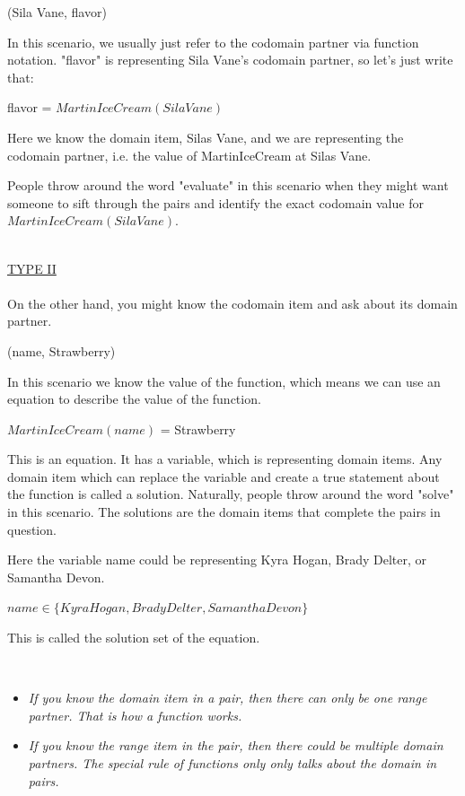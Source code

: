\documentclass{ximera}
\begin{document}
\begin{center}
(Sila Vane, flavor)
\end{center}


In this scenario, we usually just refer to the codomain partner via function notation. "flavor" is representing Sila Vane's codomain partner, so let's just write that:
\begin{center}
flavor = $MartinIceCream(Sila Vane)$
\end{center}

Here we know the domain item, Silas Vane, and we are representing the codomain partner, i.e. the value of MartinIceCream at Silas Vane.  

People throw around the word "evaluate" in this scenario when they might want someone to sift through the pairs and identify the exact codomain value for $MartinIceCream(Sila Vane)$.

\quad \\
\underline{TYPE II} \\
\quad \\

On the other hand, you might know the codomain item and ask about its domain partner.
\begin{center}
(name, Strawberry)
\end{center}

In this scenario we know the value of the function, which means we can use an equation to describe the value of the function.
\begin{center}
$MartinIceCream(name)$ = Strawberry 
\end{center}


This is an equation.  It has a variable, which is representing domain items. Any domain item which can replace the variable and create a true statement about the function is called a solution.  Naturally, people throw around the word "solve" in this scenario. The solutions are the domain items that complete the pairs in question.

Here the variable name could be representing Kyra Hogan, Brady Delter, or Samantha Devon.


$name \in \{ Kyra Hogan, Brady Delter, Samantha Devon \}$

This is called the solution set of the equation.


\quad \\

\begin{itemize}
\item \textit{If you know the domain item in a pair, then there can only be one range partner.  That is how a function works.}

\item \textit{If you know the range item in the pair, then there could be multiple domain partners. The special rule of functions only only talks about the domain in pairs.}
\end{itemize}
\end{document}
